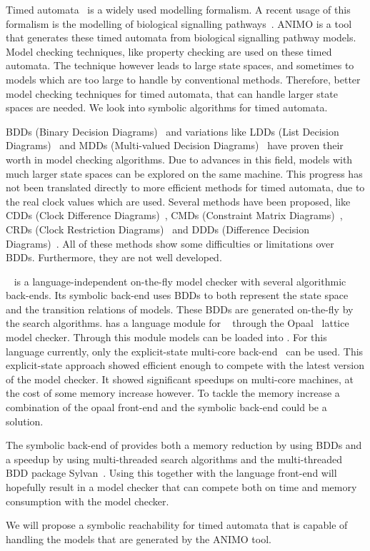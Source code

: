 Timed automata~\cite{Alur1994183} is a widely used modelling formalism. A recent usage of this formalism is the modelling of biological signalling pathways~\cite{SchivoSWCVKLPP12}. ANIMO is a tool that generates these timed automata from biological signalling pathway models. Model checking techniques, like property checking are used on these timed automata. The technique however leads to large state spaces, and sometimes to models which are too large to handle by conventional methods. Therefore, better model checking techniques for timed automata, that can handle larger state spaces are needed. We look into symbolic algorithms for timed automata.

BDDs (Binary Decision Diagrams)~\cite{Akers:1978:BDD:1310167.1310815,1676819} and variations like LDDs (List Decision Diagrams)~\cite{so62465} and MDDs (Multi-valued Decision Diagrams)~\cite{129849} have proven their worth in model checking algorithms. Due to advances in this field, models with much larger state spaces can be explored on the same machine. This progress has not been translated directly to more efficient methods for timed automata, due to the real clock values which are used. Several methods have been proposed, like CDDs (Clock Difference Diagrams)~\cite{BRICS19491}, CMDs (Constraint Matrix Diagrams)~\cite{5702245}, CRDs (Clock Restriction Diagrams)~\cite{crds} and DDDs (Difference Decision Diagrams)~\cite{ddds, ddd-datastructure-99}. All of these methods show some difficulties or limitations over BDDs. Furthermore, they are not well developed.

\ltsmin{}~\cite{eemcs18152,ltsmin-mc:nmf2011} is a language-independent on-the-fly model checker with several algorithmic back-ends. Its symbolic back-end uses BDDs to both represent the state space and the transition relations of models. These BDDs are generated on-the-fly by the search algorithms. \ltsmin{} has a language module for \uppaal{}~\cite{UPPAAL} through the Opaal~\cite{opaal} lattice model checker. Through this module \uppaal{} models can be loaded into \ltsmin{}. For this language currently, only the explicit-state multi-core back-end~\cite{eemcs21972} can be used. This explicit-state approach showed efficient enough to compete with the latest version of the \uppaal{} model checker. It showed significant speedups on multi-core machines, at the cost of some memory increase however. To tackle the memory increase a combination of the opaal front-end and the symbolic back-end could be a solution.

The symbolic back-end of \ltsmin{} provides both a memory reduction by using BDDs and a speedup by using multi-threaded search algorithms and the multi-threaded BDD package Sylvan~\cite{sylvan}. Using this together with the \uppaal{} language front-end will hopefully result in a model checker that can compete both on time and memory consumption with the \uppaal{} model checker.

We will propose a symbolic reachability for timed automata that is capable of handling the models that are generated by the ANIMO tool.
